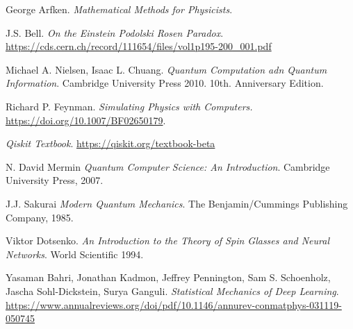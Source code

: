\documentclass[a4paper]{article}
\begin{document}
\begin{thebibliography}{99}
 George Arfken. \textit{Mathematical Methods for Physicists}.

 J.S. Bell. \textit{On the Einstein Podolski Rosen Paradox}. \url{https://cds.cern.ch/record/111654/files/vol1p195-200_001.pdf}

 Michael A. Nielsen, Isaac L. Chuang. \textit{Quantum Computation adn Quantum Information}. Cambridge University Press 2010. 10th. Anniversary Edition.

 Richard P. Feynman. \textit{Simulating Physics with Computers.} \url{https://doi.org/10.1007/BF02650179}.

 \textit{Qiskit Textbook}. \url{https://qiskit.org/textbook-beta}

 N. David Mermin \textit{Quantum Computer Science: An Introduction}. Cambridge University Press, 2007.

 J.J. Sakurai \textit{Modern Quantum Mechanics}. The Benjamin/Cummings Publishing Company, 1985.

 Viktor Dotsenko. \textit{An Introduction to the Theory of Spin Glasses and Neural Networks}. World Scientific 1994.

 Yasaman Bahri, Jonathan Kadmon, Jeffrey Pennington, Sam S. Schoenholz, Jascha Sohl-Dickstein, Surya Ganguli. \textit{Statistical Mechanics of Deep Learning}. \url{https://www.annualreviews.org/doi/pdf/10.1146/annurev-conmatphys-031119-050745}


\end{thebibliography}
\end{document}
